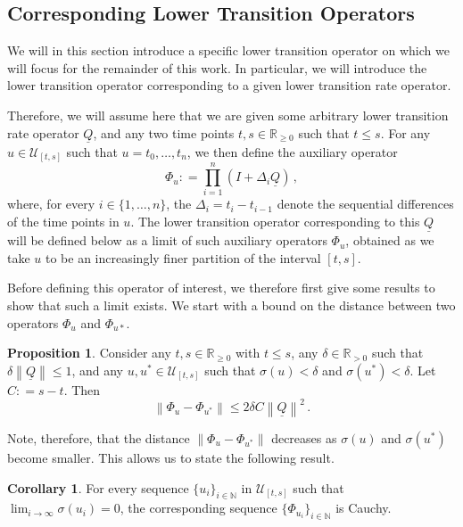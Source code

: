 \documentclass[10pt,a4paper]{paper}
\theoremstyle{definition}
\newtheorem{proposition}[theorem]{Proposition}
\newtheorem{corollary}[theorem]{Corollary}
\newcommand{\nats}{\mathbb{N}}
\newcommand{\reals}{\mathbb{R}}
\newcommand{\realspos}{\reals_{>0}}
\newcommand{\realsnonneg}{\reals_{\geq 0}}
\newcommand{\lrate}{\underline{Q}}
\newcommand{\norm}[1]{\left\lVert #1 \right\rVert}
\newcommand{\coloneqq}{:\!=}
\begin{document}
\subsection{Corresponding Lower Transition Operators}

We will in this section introduce a specific lower transition operator on which we will focus for the remainder of this work. In particular, we will introduce the lower transition operator corresponding to a given lower transition rate operator.

Therefore, we will assume here that we are given some arbitrary lower transition rate operator $\lrate$, and any two time points $t,s\in\realsnonneg$ such that $t\leq s$. For any $u\in\mathcal{U}_{[t,s]}$ such that $u=t_0,\ldots,t_n$, we then define the auxiliary operator
\begin{equation}\label{eq:aux_lower_trans}
\Phi_u\coloneqq\prod_{i=1}^n(I+\Delta_i\lrate)\,,
\end{equation}
where, for every $i\in\{1,\ldots,n\}$, the $\Delta_i=t_i-t_{i-1}$ denote the sequential differences of the time points in $u$. The lower transition operator corresponding to this $\lrate$ will be defined below as a limit of such auxiliary operators $\Phi_u$, obtained as we take $u$ to be an increasingly finer partition of the interval $[t,s]$.

Before defining this operator of interest, we therefore first give some results to show that such a limit exists. We start with a bound on the distance between two operators $\Phi_u$ and $\Phi_{u*}$.

\begin{proposition}\label{prop:differencebetweenu}
Consider any $t,s\in\realsnonneg$ with $t\leq s$, any $\delta\in\realspos$ such that $\delta\norm{\lrate}\leq1$, and any $u,u^*\in\mathcal{U}_{[t,s]}$ such that $\sigma(u)<\delta$ and $\sigma(u^*)<\delta$. Let $C\coloneqq s-t$. Then
\begin{equation*}
\norm{\Phi_u-\Phi_{u^*}}\leq 2\delta C\norm{\lrate}^2\,.
\end{equation*}
\end{proposition}

Note, therefore, that the distance $\norm{\Phi_u - \Phi_{u^*}}$ decreases as $\sigma(u)$ and $\sigma(u^*)$ become smaller. This allows us to state the following result.

\begin{corollary}\label{corol:cauchy}
For every sequence $\{u_i\}_{i\in\nats}$ in $\mathcal{U}_{[t,s]}$ such that $\lim_{i\to\infty}\sigma(u_i)=0$, the corresponding sequence $\{\Phi_{u_i}\}_{i\in\nats}$ is Cauchy.
\end{corollary}
\end{document}
